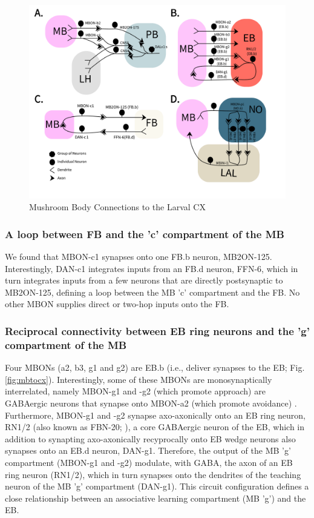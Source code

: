     \begin{figure}
        \centering
        \includegraphics[width=17cm]{Figs/CX/MBtoCX.pdf}
        \caption[Mushroom Body Connections to the Larval CX]{Mushroom Body Connections to the Larval CX}
        \label{MBtoCX}
    \end{figure}

    \subsubsection{A loop between FB and the 'c' compartment of the MB}
    We found that MBON-c1 synapses onto one FB.b neuron, MB2ON-125.
    Interestingly, DAN-c1 integrates inputs from an FB.d neuron, FFN-6, which in turn integrates inputs from a few neurons that are directly postsynaptic to MB2ON-125, defining a loop between the MB 'c' compartment and the FB.
    No other MBON supplies direct or two-hop inputs onto the FB.

    \subsubsection{Reciprocal connectivity between EB ring neurons and the 'g' compartment of the MB}
    Four MBONs (a2, b3, g1 and g2) are EB.b (i.e., deliver synapses to the EB; Fig. \ref{fig:mbtocx}). Interestingly, some of these MBONs are monosynaptically interrelated, namely MBON-g1 and -g2 (which promote approach) are GABAergic neurons that synapse onto MBON-a2 (which promote avoidance) \citep{eschbach2021circuits}.
    Furthermore, MBON-g1 and -g2 synapse axo-axonically onto an EB ring neuron, RN1/2 (also known as FBN-20; \citep{eschbach2021circuits}), a core GABAergic neuron of the EB, which in addition to synapting axo-axonically recyprocally onto EB wedge neurons also synapses onto an EB.d neuron, DAN-g1.
    Therefore, the output of the MB 'g' compartment (MBON-g1 and -g2) modulate, with GABA, the axon of an EB ring neuron (RN1/2), which in turn synapses onto the dendrites of the teaching neuron of the MB 'g' compartment (DAN-g1).
    This circuit configuration defines a close relationship between an associative learning compartment (MB 'g') and the EB.

